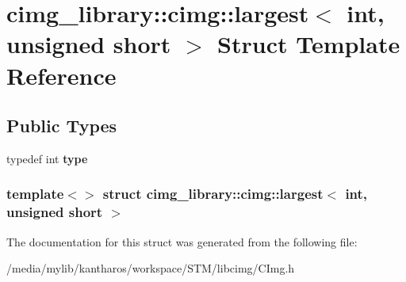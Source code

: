 \hypertarget{structcimg__library_1_1cimg_1_1largest_3_01int_00_01unsigned_01short_01_4}{
\section{cimg\_\-library::cimg::largest$<$ int, unsigned short $>$ Struct Template Reference}
\label{structcimg__library_1_1cimg_1_1largest_3_01int_00_01unsigned_01short_01_4}
}
\subsection*{Public Types}
\begin{DoxyCompactItemize}
\item 
\hypertarget{structcimg__library_1_1cimg_1_1largest_3_01int_00_01unsigned_01short_01_4_a668dfbb99ba4456c6bfb04654a10b1d8}{
typedef int {\bfseries type}}
\label{structcimg__library_1_1cimg_1_1largest_3_01int_00_01unsigned_01short_01_4_a668dfbb99ba4456c6bfb04654a10b1d8}

\end{DoxyCompactItemize}
\subsubsection*{template$<$$>$ struct cimg\_\-library::cimg::largest$<$ int, unsigned short $>$}



The documentation for this struct was generated from the following file:\begin{DoxyCompactItemize}
\item 
/media/mylib/kantharos/workspace/STM/libcimg/CImg.h\end{DoxyCompactItemize}
